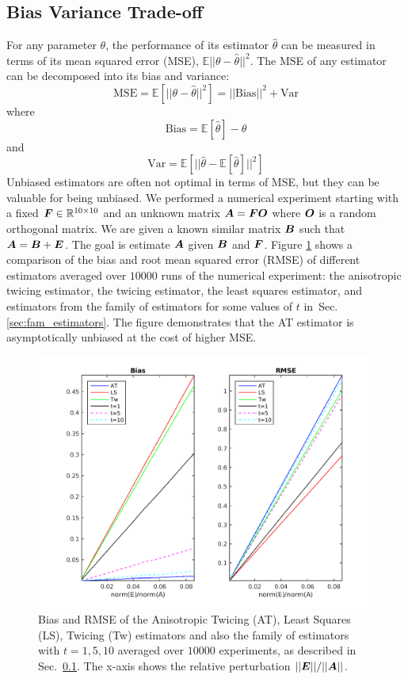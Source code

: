 \subsection{Bias Variance Trade-off}
\label{subsec:biasvar}
For any parameter $\theta$, the performance of its estimator $\hat{\theta}$ can 
be measured in terms of its mean squared error (MSE), 
$\mathbb{E}||\theta-\hat{\theta}||^2$.
The MSE of any estimator can be decomposed into its bias and variance:
\begin{equation}
\label{eqn:biasvar}
\text{MSE}=\mathbb{E}[||\theta-\hat{\theta}||^2] = ||\text{Bias}||^2 + \text{Var}
\end{equation}
where
\begin{equation}
\text{Bias}= \mathbb{E}[\hat{\theta}]-\theta 
\end{equation}
and
\begin{equation}
\text{Var}= \mathbb{E}[||\hat{\theta}-\mathbb{E}[\hat{\theta}] ||^2]
\end{equation}
Unbiased estimators are often not optimal in terms of 
MSE, but they can be valuable for being unbiased. We performed a numerical 
experiment starting with a fixed $\boldsymbol{F} \in \mathbb{R}^{10 \times 10}$ and an 
unknown matrix $\boldsymbol{A} = \boldsymbol{F} \boldsymbol{O}$ where $\boldsymbol{O}$ is a random orthogonal matrix. We 
are given a known similar matrix $\boldsymbol{B}$ such that $\boldsymbol{A} = \boldsymbol{B} + \boldsymbol{E}$. The goal is 
estimate $\boldsymbol{A}$ given $\boldsymbol{B}$ and $\boldsymbol{F}$.  Figure \ref{fig:biasvar} shows a 
comparison of the bias and root mean squared error (RMSE) of different estimators averaged over $10000$ runs of 
the numerical experiment: the anisotropic twicing estimator, the twicing 
estimator, the least squares estimator, and estimators from the family of 
estimators for some values of $t$ in~Sec. \ref{sec:fam_estimators}. The figure demonstrates that the AT estimator 
is asymptotically unbiased at the cost of higher MSE. 
\begin{figure}[]
\includegraphics[width=0.9\linewidth]{figures/anis_bias_family.png}%
\caption{Bias and RMSE of the Anisotropic Twicing (AT), Least Squares (LS), 
Twicing (Tw) estimators and also the family of estimators with $t=1,5,10$  averaged over $10000$ experiments, as described in 
Sec.~\ref{subsec:biasvar}. The x-axis shows the relative perturbation 
$||\boldsymbol{E}||/||\boldsymbol{A}||$. }
\label{fig:biasvar}
\end{figure}

